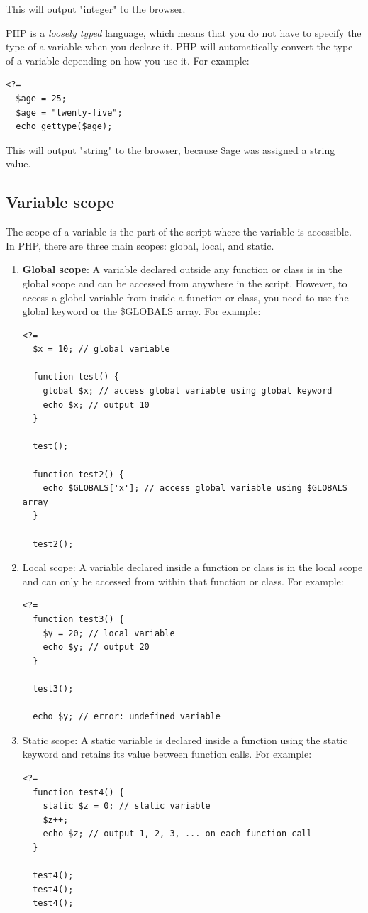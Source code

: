 \documentclass[11pt]{article}
\begin{document}
This will output "integer" to the browser.

PHP is a \emph{loosely typed} language, which means that you do not have to
specify the type of a variable when you declare it. PHP will
automatically convert the type of a variable depending on how you use
it. For example:

\begin{verbatim}
<?=
  $age = 25;
  $age = "twenty-five";
  echo gettype($age);
\end{verbatim}

This will output "string" to the browser, because \$age was assigned a
string value.

\subsection{Variable scope}
\label{sec:orgb09a4d7}
The scope of a variable is the part of the script where the variable is
accessible. In PHP, there are three main scopes: global, local, and
static.

\begin{enumerate}
\item \textbf{Global scope}: A variable declared outside any function or class is in
the global scope and can be accessed from anywhere in the script.
However, to access a global variable from inside a function or class,
you need to use the global keyword or the \$GLOBALS array. For
example:

\begin{verbatim}
<?=
  $x = 10; // global variable

  function test() {
    global $x; // access global variable using global keyword
    echo $x; // output 10
  }

  test();

  function test2() {
    echo $GLOBALS['x']; // access global variable using $GLOBALS array
  }

  test2();
\end{verbatim}

\item Local scope: A variable declared inside a function or class is in the
local scope and can only be accessed from within that function or
class. For example:

\begin{verbatim}
<?=
  function test3() {
    $y = 20; // local variable
    echo $y; // output 20
  }

  test3();

  echo $y; // error: undefined variable
\end{verbatim}

\item Static scope: A static variable is declared inside a function using
the static keyword and retains its value between function calls. For
example:

\begin{verbatim}
<?=
  function test4() {
    static $z = 0; // static variable
    $z++;
    echo $z; // output 1, 2, 3, ... on each function call
  }

  test4();
  test4();
  test4();
\end{verbatim}
\end{enumerate}
\end{document}
